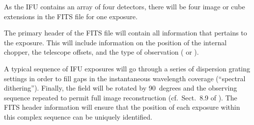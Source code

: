 As the IFU contains an array of four detectors, there will be four
image or cube extensions in the FITS file for one exposure.

The primary header of the FITS file will contain all information that
pertains to the exposure. This will include information on the
position of the internal chopper, the telescope offsets, and the type
of observation ( or ).

A typical sequence of IFU exposures will go through a series of
dispersion grating settings in order to fill gaps in the instantaneous
wavelength coverage (``spectral dithering''). Finally, the field will be
rotated by 90~degrees and the observing sequence repeated to permit
full image reconstruction
(cf.~Sect.~8.9 of \cite{DRLS}). The FITS header
information will ensure that the position of each exposure within this
complex sequence can be uniquely identified.




